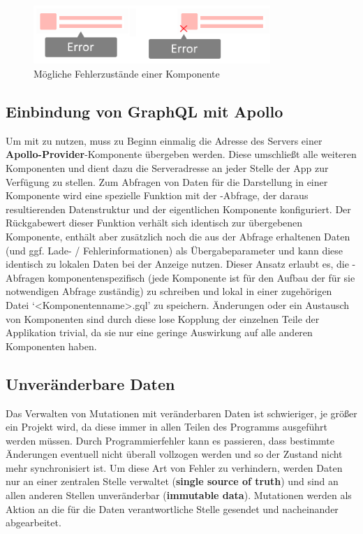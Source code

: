 \begin{figure}
    \centering
    \captionsetup{justification=centering}
    \includegraphics[width=0.8\textwidth]{figures/comp_possible_error_state.png}
        \caption{Mögliche Fehlerzustände einer Komponente}\label{fig:comp_possible_error_state}
\end{figure}

\subsection{Einbindung von GraphQL mit Apollo}
Um  mit  zu nutzen, muss zu Beginn einmalig die Adresse des Servers einer \textbf{Apollo-Provider}-Komponente übergeben werden. Diese umschließt alle weiteren Komponenten und dient dazu die Serveradresse an jeder Stelle der App zur Verfügung zu stellen. Zum Abfragen von Daten für die Darstellung in einer Komponente wird eine spezielle Funktion mit der -Abfrage, der daraus resultierenden Datenstruktur und der eigentlichen Komponente konfiguriert. Der Rückgabewert dieser Funktion verhält sich identisch zur übergebenen Komponente, enthält aber zusätzlich noch die aus der Abfrage erhaltenen Daten (und ggf. Lade- / Fehlerinformationen) als Übergabeparameter und kann diese identisch zu lokalen Daten bei der Anzeige nutzen.
Dieser Ansatz erlaubt es, die -Abfragen komponentenspezifisch (jede Komponente ist für den Aufbau der für sie notwendigen Abfrage zuständig) zu schreiben und lokal in einer zugehörigen Datei `<Komponentenname>.gql' zu speichern. Änderungen oder ein Austausch von Komponenten sind durch diese lose Kopplung der einzelnen Teile der Applikation trivial, da sie nur eine geringe Auswirkung auf alle anderen Komponenten haben.

\subsection{Unveränderbare Daten}
Das Verwalten von Mutationen mit veränderbaren Daten ist schwieriger, je größer ein Projekt wird, da diese immer in allen Teilen des Programms ausgeführt werden müssen. Durch Programmierfehler kann es passieren, dass bestimmte Änderungen eventuell nicht überall vollzogen werden und so der Zustand nicht mehr synchronisiert ist. Um diese Art von Fehler zu verhindern, werden Daten nur an einer zentralen Stelle verwaltet (\textbf{single source of truth}) und sind an allen anderen Stellen unveränderbar (\textbf{immutable data}). Mutationen werden als Aktion an die für die Daten verantwortliche Stelle gesendet und nacheinander abgearbeitet.

